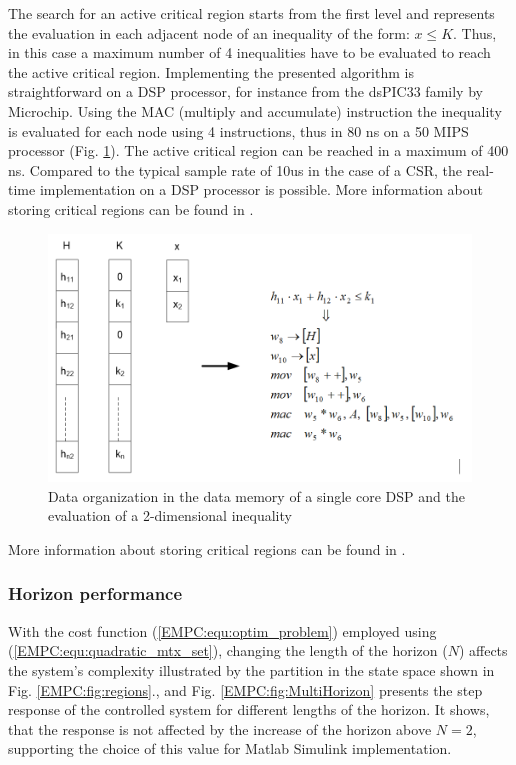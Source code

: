     The search for an active critical region starts from the first level and represents the evaluation in each adjacent node of an inequality of the form: $x\leq K$. Thus, in this case a maximum number of 4 inequalities have to be evaluated to reach the active critical region. Implementing the presented algorithm is straightforward on a DSP processor, for instance from the dsPIC33 family by Microchip. Using the MAC (multiply and accumulate) instruction the inequality is evaluated for each node using 4 instructions, thus in 80 ns on a 50 MIPS processor (Fig. \ref{EMPC:fig:Memory}). The active critical region can be reached in a maximum of 400 ns. Compared to the typical sample rate of 10us in the case of a CSR, the real-time implementation on a DSP processor is possible. More information about storing critical regions can be found in .
    
    \begin{figure}[!ht]
        \centering
        \includegraphics[width=\textwidth]{EMPC_PNG_Pics/Memory.png}
        \caption{Data organization in the data memory of a single core DSP and the evaluation of a 2-dimensional inequality}
        \label{EMPC:fig:Memory}
    \end{figure}
    
    More information about storing critical regions can be found in .

    \subsubsection{Horizon performance}\label{EMPC:sec:Performance}

    With the cost function (\ref{EMPC:equ:optim_problem}) employed using (\ref{EMPC:equ:quadratic_mtx_set}), changing the length of the horizon ($N$) affects the system's complexity illustrated by the partition in the state space shown in Fig. \ref{EMPC:fig:regions}., and Fig. \ref{EMPC:fig:MultiHorizon} presents the step response of the controlled system for different lengths of the horizon. It shows, that the response is not affected by the increase of the horizon above $N=2$, supporting the choice of this value for Matlab Simulink implementation.

